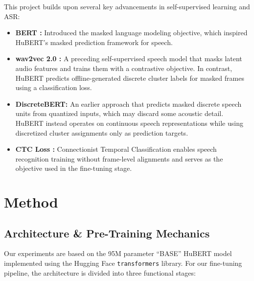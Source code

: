 \documentclass[conference]{IEEEtran}
\begin{document}
This project builds upon several key advancements in self-supervised learning and ASR:
\begin{itemize}
    \item \textbf{BERT \cite{bert}:} Introduced the masked language modeling objective, which inspired HuBERT’s masked prediction framework for speech.
    \item \textbf{wav2vec 2.0 \cite{wav2vec}:} A preceding self-supervised speech model that masks latent audio features and trains them with a contrastive objective.
    In contrast, HuBERT predicts offline-generated discrete cluster labels for masked frames using a classification loss.
    \item \textbf{DiscreteBERT:} An earlier approach that predicts masked discrete speech units from quantized inputs, which may discard some acoustic detail.
    HuBERT instead operates on continuous speech representations while using discretized cluster assignments only as prediction targets.
    \item \textbf{CTC Loss \cite{ctc}:} Connectionist Temporal Classification enables speech recognition training without frame-level alignments and serves as the objective used in the fine-tuning stage.
\end{itemize}

\section{Method}

\subsection{Architecture \& Pre-Training Mechanics}

Our experiments are based on the 95M parameter ``BASE'' HuBERT model \cite{hubert} implemented using the Hugging Face \texttt{transformers} library.
For our fine-tuning pipeline, the architecture is divided into three functional stages:
\end{document}
